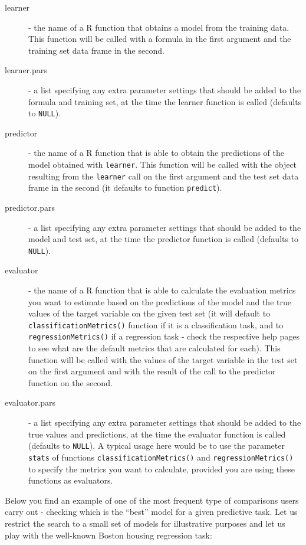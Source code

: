 \documentclass[10pt,a4paper]{article}\usepackage[]{graphicx}\usepackage[]{color}
\begin{document}
\begin{description}
\item[learner] - the name of a R function that obtains a model from the training data. This function will be called with a formula in the first argument and the training set data frame in the second.
\item[learner.pars] - a list specifying any extra parameter settings that should be added to the formula and training set, at the time the learner function is called (defaults to \texttt{NULL}).
\item[predictor] - the name of a R function that is able to obtain the predictions of the model obtained with \texttt{learner}. This function will be called with the object resulting from the \texttt{learner} call on the first argument and the test set data frame in the second (it defaults to function \texttt{predict}).
\item[predictor.pars] - a list specifying any extra parameter settings that should be added to the model and test set, at the time the predictor function is called (defaults to \texttt{NULL}).
\item[evaluator] - the name of a R function that is able to calculate the evaluation metrics you want to estimate based on the predictions of the model and the true values of the target variable on the given test set (it will default to \texttt{classificationMetrics()} function if it is a classification task, and to \texttt{regressionMetrics()} if a regression task - check the respective help pages to see what are the default metrics that are calculated for each). This function will be called with the values of the target variable in the test set on the first argument and with the result of the call to the predictor function on the second.
\item[evaluator.pars] -  a list specifying any extra parameter settings that should be added to the true values and predictions, at the time the evaluator function is called (defaults to \texttt{NULL}). A typical usage here would be to use the parameter \texttt{stats} of functions \texttt{classificationMetrics()} and \texttt{regressionMetrics()} to specify the metrics you want to calculate, provided you are using these functions as evaluators.
\end{description}


Below you find an example of one of the most frequent type of
comparisons users carry out - checking which is the ``best'' model for
a given predictive task. Let us restrict the search to a small set of
models for illustrative purposes and let us play with the well-known
Boston housing regression task:
\end{document}

